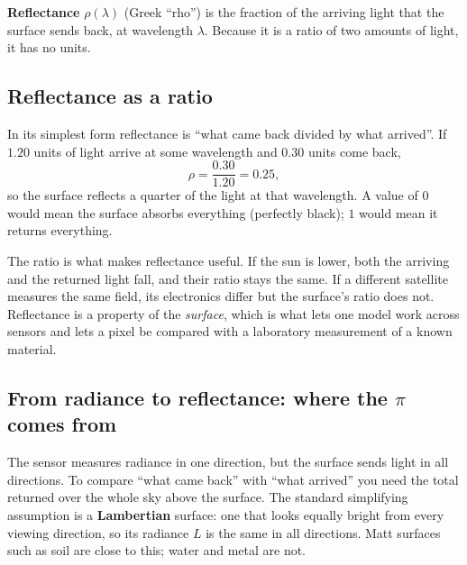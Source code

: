 \begin{definition}[Reflectance]
\textbf{Reflectance} $\rho(\lambda)$ (Greek ``rho'') is the fraction of the arriving light that
the surface sends back, at wavelength $\lambda$. Because it is a ratio of two amounts of light,
it has no units.
\end{definition}

\subsection{Reflectance as a ratio}

In its simplest form reflectance is ``what came back divided by what arrived''. If $1.20$ units of
light arrive at some wavelength and $0.30$ units come back,
\[ \rho = \frac{0.30}{1.20} = 0.25, \]
so the surface reflects a quarter of the light at that wavelength. A value of $0$ would mean the
surface absorbs everything (perfectly black); $1$ would mean it returns everything.

The ratio is what makes reflectance useful. If the sun is lower, both the arriving and the
returned light fall, and their ratio stays the same. If a different satellite measures the same
field, its electronics differ but the surface's ratio does not. Reflectance is a property of the
\emph{surface}, which is what lets one model work across sensors and lets a pixel be compared with
a laboratory measurement of a known material.

\subsection{From radiance to reflectance: where the \texorpdfstring{$\pi$}{pi} comes from}

The sensor measures radiance in one direction, but the surface sends light in all directions.
To compare ``what came back'' with ``what arrived'' you need the total returned over the whole sky
above the surface. The standard simplifying assumption is a
\textbf{Lambertian} surface: one that looks equally bright from every
viewing direction, so its radiance $L$ is the same in all directions. Matt surfaces such as soil
are close to this; water and metal are not.

